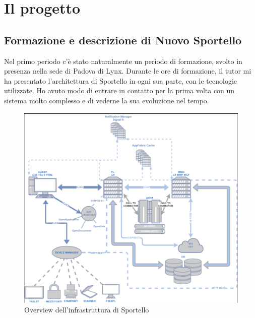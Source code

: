 \section{Il progetto}

\subsection{Formazione e descrizione di Nuovo Sportello}
Nel primo periodo c'è stato naturalmente un periodo di formazione, svolto in presenza nella sede di Padova di Lynx. Durante le ore di formazione, il tutor \NST mi ha presentato l'architettura di Sportello in ogni sua parte, con le tecnologie utilizzate. Ho avuto modo di entrare in contatto per la prima volta con un sistema molto complesso e di vederne la sua evoluzione nel tempo. \\

\begin{figure}[h]
	\includegraphics[width=\textwidth]{./res/img/infrastruttura sportello.png}
    \caption{Overview dell'infrastruttura di Sportello}
\end{figure}

